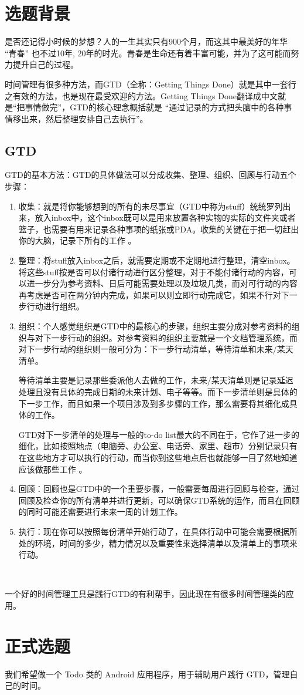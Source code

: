 \section{选题背景}
\label{sec:选题背景}

是否还记得小时候的梦想？人的一生其实只有900个月，而这其中最美好的年华 “青春” 也不过10年, 20年的时光。青春是生命还有着丰富可能，并为了这可能而努力提升自己的过程。

时间管理有很多种方法，而GTD（全称：Getting Things Done）就是其中一套行之有效的方法，也是现在最受欢迎的方法。Getting Things Done翻译成中文就是“把事情做完”，GTD的核心理念概括就是 “通过记录的方式把头脑中的各种事情移出来，然后整理安排自己去执行”。

\subsection{GTD}
\label{sub:GTD}

GTD的基本方法：GTD的具体做法可以分成收集、整理、组织、回顾与行动五个步骤：

\begin{enumerate}
    \item 收集：就是将你能够想到的所有的未尽事宜（GTD中称为stuff）统统罗列出来，放入inbox中，这个inbox既可以是用来放置各种实物的实际的文件夹或者篮子，也需要有用来记录各种事项的纸张或PDA。收集的关键在于把一切赶出你的大脑，记录下所有的工作 。
    \item 整理：将stuff放入inbox之后，就需要定期或不定期地进行整理，清空inbox。将这些stuff按是否可以付诸行动进行区分整理，对于不能付诸行动的内容，可以进一步分为参考资料、日后可能需要处理以及垃圾几类，而对可行动的内容再考虑是否可在两分钟内完成，如果可以则立即行动完成它，如果不行对下一步行动进行组织。
    \item 组织：个人感觉组织是GTD中的最核心的步骤，组织主要分成对参考资料的组织与对下一步行动的组织。对参考资料的组织主要就是一个文档管理系统，而对下一步行动的组织则一般可分为：下一步行动清单，等待清单和未来/某天清单。

    等待清单主要是记录那些委派他人去做的工作，未来/某天清单则是记录延迟处理且没有具体的完成日期的未来计划、电子等等。而下一步清单则是具体的下一步工作，而且如果一个项目涉及到多步骤的工作，那么需要将其细化成具体的工作。

    GTD对下一步清单的处理与一般的to-do list最大的不同在于，它作了进一步的细化，比如按照地点（电脑旁、办公室、电话旁、家里、超市）分别记录只有在这些地方才可以执行的行动，而当你到这些地点后也就能够一目了然地知道应该做那些工作 。

    \item 回顾：回顾也是GTD中的一个重要步骤，一般需要每周进行回顾与检查，通过回顾及检查你的所有清单并进行更新，可以确保GTD系统的运作，而且在回顾的同时可能还需要进行未来一周的计划工作。

    \item 执行：现在你可以按照每份清单开始行动了，在具体行动中可能会需要根据所处的环境，时间的多少，精力情况以及重要性来选择清单以及清单上的事项来行动。
\end{enumerate}　

一个好的时间管理工具是践行GTD的有利帮手，因此现在有很多时间管理类的应用。

\section{正式选题}
\label{sec:正式选题}

我们希望做一个 Todo 类的 Android 应用程序，用于辅助用户践行 GTD，管理自己的时间。